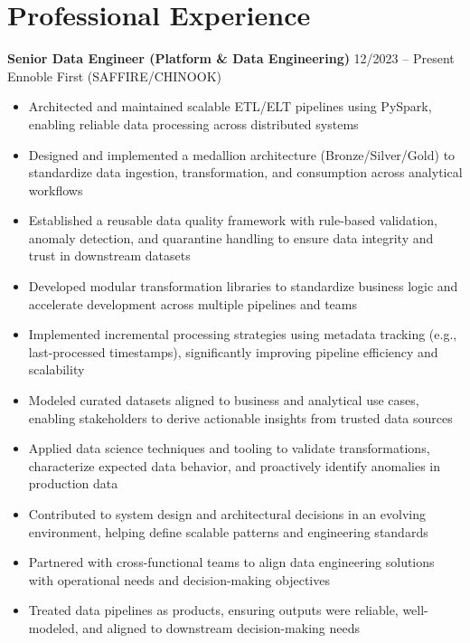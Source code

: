 \section*{Professional Experience}


\textbf{Senior Data Engineer (Platform \& Data Engineering)} \hfill 12/2023 – Present \\
Ennoble First (SAFFIRE/CHINOOK)
\begin{itemize}
\item Architected and maintained scalable ETL/ELT pipelines using PySpark, enabling reliable data processing across distributed systems  
\item Designed and implemented a medallion architecture (Bronze/Silver/Gold) to standardize data ingestion, transformation, and consumption across analytical workflows  
\item Established a reusable data quality framework with rule-based validation, anomaly detection, and quarantine handling to ensure data integrity and trust in downstream datasets  
\item Developed modular transformation libraries to standardize business logic and accelerate development across multiple pipelines and teams  
\item Implemented incremental processing strategies using metadata tracking (e.g., last-processed timestamps), significantly improving pipeline efficiency and scalability  
\item Modeled curated datasets aligned to business and analytical use cases, enabling stakeholders to derive actionable insights from trusted data sources  
\item Applied data science techniques and tooling to validate transformations, characterize expected data behavior, and proactively identify anomalies in production data  
\item Contributed to system design and architectural decisions in an evolving environment, helping define scalable patterns and engineering standards  
\item Partnered with cross-functional teams to align data engineering solutions with operational needs and decision-making objectives  
\item Treated data pipelines as products, ensuring outputs were reliable, well-modeled, and aligned to downstream decision-making needs  
\end{itemize}
\vspace{0.3em}

